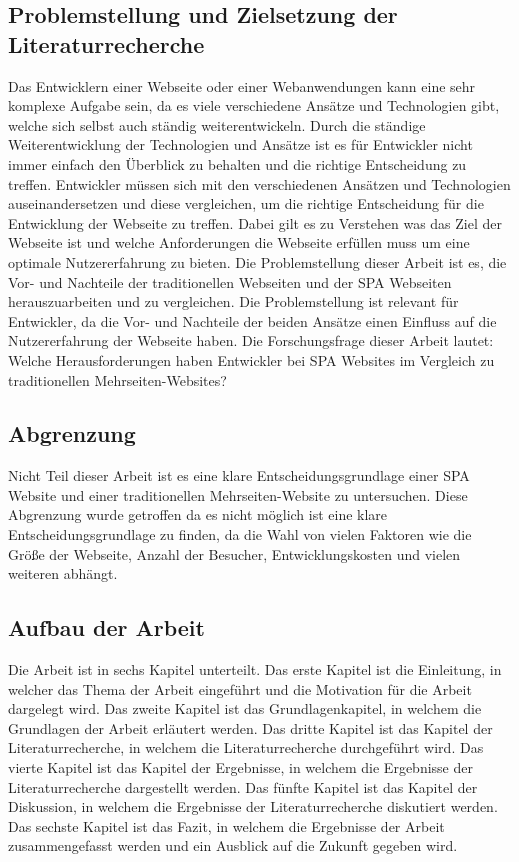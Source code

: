 \subsection{Problemstellung und Zielsetzung der Literaturrecherche}
Das Entwicklern einer Webseite oder einer Webanwendungen kann eine sehr komplexe Aufgabe sein, da es viele verschiedene Ansätze und Technologien gibt, welche sich selbst auch ständig weiterentwickeln.
Durch die ständige Weiterentwicklung der Technologien und Ansätze ist es für Entwickler nicht immer einfach den Überblick zu behalten und die richtige Entscheidung zu treffen.
Entwickler müssen sich mit den verschiedenen Ansätzen und Technologien auseinandersetzen und diese vergleichen, um die richtige Entscheidung für die Entwicklung der Webseite zu treffen.
Dabei gilt es zu Verstehen was das Ziel der Webseite ist und welche Anforderungen die Webseite erfüllen muss um eine optimale Nutzererfahrung zu bieten.
Die Problemstellung dieser Arbeit ist es, die Vor- und Nachteile der traditionellen Webseiten und der \ac{SPA} Webseiten herauszuarbeiten und zu vergleichen.
Die Problemstellung ist relevant für Entwickler, da die Vor- und Nachteile der beiden Ansätze einen Einfluss auf die Nutzererfahrung der Webseite haben.
Die Forschungsfrage dieser Arbeit lautet: Welche Herausforderungen haben Entwickler bei \ac{SPA} Websites im Vergleich zu traditionellen Mehrseiten-Websites?

\subsection{Abgrenzung}
Nicht Teil dieser Arbeit ist es eine klare Entscheidungsgrundlage einer \ac{SPA} Website und einer traditionellen Mehrseiten-Website zu untersuchen.
Diese Abgrenzung wurde getroffen da es nicht möglich ist eine klare Entscheidungsgrundlage zu finden, da die Wahl von vielen Faktoren wie die Größe der Webseite,
Anzahl der Besucher, Entwicklungskosten und vielen weiteren abhängt.

\subsection{Aufbau der Arbeit}

Die Arbeit ist in sechs Kapitel unterteilt.
Das erste Kapitel ist die Einleitung, in welcher das Thema der Arbeit eingeführt und die Motivation für die Arbeit dargelegt wird.
Das zweite Kapitel ist das Grundlagenkapitel, in welchem die Grundlagen der Arbeit erläutert werden.
Das dritte Kapitel ist das Kapitel der Literaturrecherche, in welchem die Literaturrecherche durchgeführt wird.
Das vierte Kapitel ist das Kapitel der Ergebnisse, in welchem die Ergebnisse der Literaturrecherche dargestellt werden.
Das fünfte Kapitel ist das Kapitel der Diskussion, in welchem die Ergebnisse der Literaturrecherche diskutiert werden.
Das sechste Kapitel ist das Fazit, in welchem die Ergebnisse der Arbeit zusammengefasst werden und ein Ausblick auf die Zukunft gegeben wird.

